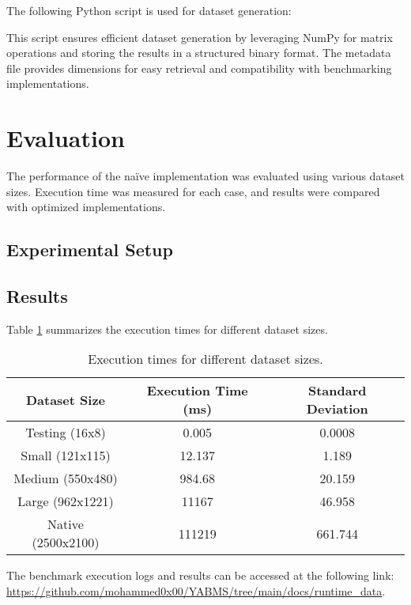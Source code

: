 \documentclass[12pt]{article}
\begin{document}
The following Python script is used for dataset generation:


This script ensures efficient dataset generation by leveraging NumPy for matrix operations and storing the results in a structured binary format. The metadata file provides dimensions for easy retrieval and compatibility with benchmarking implementations.

\section{Evaluation}
The performance of the naïve implementation was evaluated using various dataset sizes. Execution time was measured for each case, and results were compared with optimized implementations.

\subsection{Experimental Setup}


\subsection{Results}
Table \ref{tab:results} summarizes the execution times for different dataset sizes.

\begin{table}[h]
    \begin{tabular}{|c|c|c|}
        \hline
        \textbf{Dataset Size} & \textbf{Execution Time (ms)} & \textbf{Standard Deviation} \\
        \hline
        Testing (16x8) & 0.005 & 0.0008 \\
        Small (121x115) & 12.137 & 1.189 \\
        Medium (550x480) & 984.68 & 20.159 \\
        Large (962x1221) & 11167 & 46.958 \\
        Native (2500x2100) & 111219 & 661.744 \\
        \hline
    \end{tabular}
        \caption{Execution times for different dataset sizes.}
        \label{tab:results}
    \end{table}

    The benchmark execution logs and results can be accessed at the following link: \url{https://github.com/mohammed0x00/YABMS/tree/main/docs/runtime_data}.
\end{document}
